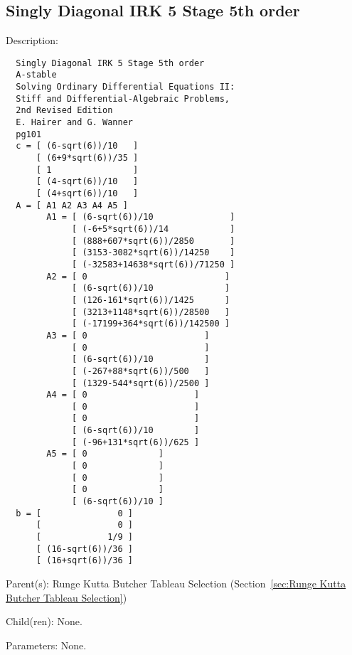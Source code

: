 \subsection{Singly Diagonal IRK 5 Stage 5th order}
\label{sec:Singly Diagonal IRK 5 Stage 5th order}

\begin{list}{}
  {\setlength{\leftmargin}{1.0in}
   \setlength{\labelwidth}{0.75in}
   \setlength{\labelsep}{0.125in}}
  \item[Description:]
\begin{verbatim}
  Singly Diagonal IRK 5 Stage 5th order
  A-stable
  Solving Ordinary Differential Equations II:
  Stiff and Differential-Algebraic Problems,
  2nd Revised Edition
  E. Hairer and G. Wanner
  pg101
  c = [ (6-sqrt(6))/10   ]
      [ (6+9*sqrt(6))/35 ]
      [ 1                ]
      [ (4-sqrt(6))/10   ]
      [ (4+sqrt(6))/10   ]
  A = [ A1 A2 A3 A4 A5 ]
        A1 = [ (6-sqrt(6))/10               ]
             [ (-6+5*sqrt(6))/14            ]
             [ (888+607*sqrt(6))/2850       ]
             [ (3153-3082*sqrt(6))/14250    ]
             [ (-32583+14638*sqrt(6))/71250 ]
        A2 = [ 0                           ]
             [ (6-sqrt(6))/10              ]
             [ (126-161*sqrt(6))/1425      ]
             [ (3213+1148*sqrt(6))/28500   ]
             [ (-17199+364*sqrt(6))/142500 ]
        A3 = [ 0                       ]
             [ 0                       ]
             [ (6-sqrt(6))/10          ]
             [ (-267+88*sqrt(6))/500   ]
             [ (1329-544*sqrt(6))/2500 ]
        A4 = [ 0                     ]
             [ 0                     ]
             [ 0                     ]
             [ (6-sqrt(6))/10        ]
             [ (-96+131*sqrt(6))/625 ]
        A5 = [ 0              ]
             [ 0              ]
             [ 0              ]
             [ 0              ]
             [ (6-sqrt(6))/10 ]
  b = [               0 ]
      [               0 ]
      [             1/9 ]
      [ (16-sqrt(6))/36 ]
      [ (16+sqrt(6))/36 ]
\end{verbatim}
  \item[Parent(s):]
    Runge Kutta Butcher Tableau Selection (Section~\ref{sec:Runge Kutta Butcher Tableau Selection})
  \item[Child(ren):]
    None. 
  \item[Parameters:]
    None. 
\end{list}

